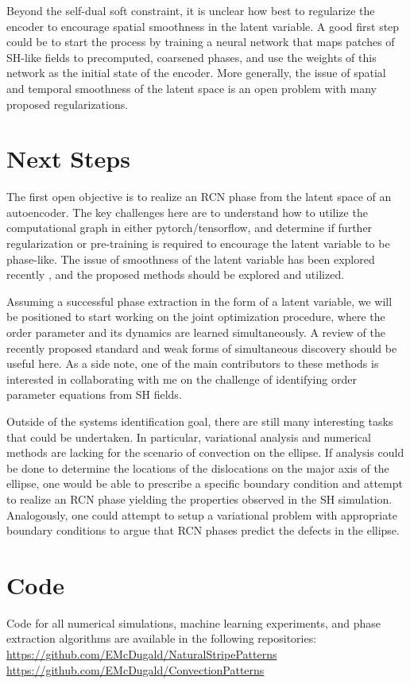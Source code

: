 \documentclass[12pt]{article}
\numberwithin{equation}{section}
\begin{document}
\par Beyond the self-dual soft constraint, it is unclear how best to regularize the encoder to encourage spatial smoothness in the latent variable. A good first step could be to start the process by training a neural network that maps patches of SH-like fields to precomputed, coarsened phases, and use the weights of this network as the initial state of the encoder. More generally, the issue of spatial and temporal smoothness of the latent space is an open problem with many proposed regularizations.


\section{Next Steps}

\par The first open objective is to realize an RCN phase from the latent space of an autoencoder. The key challenges here are to understand how to utilize the computational graph in either pytorch/tensorflow, and determine if further regularization or pre-training is required to encourage the latent variable to be phase-like. The issue of smoothness of the latent variable has been explored recently \cite{XIE2024}, and the proposed methods should be explored and utilized.
\par Assuming a successful phase extraction in the form of a latent variable, we will be positioned to start working on the joint optimization procedure, where the order parameter and its dynamics are learned simultaneously. A review of the recently proposed standard \cite{FRIES2022} and weak \cite{TRAN2023} forms of simultaneous discovery should be useful here. As a side note, one of the main contributors to these methods is interested in collaborating with me on the challenge of identifying order parameter equations from SH fields.
\par Outside of the systems identification goal, there are still many interesting tasks that could be undertaken. In particular, variational analysis and numerical methods are lacking for the scenario of convection on the ellipse. If analysis could be done to determine the locations of the dislocations on the major axis of the ellipse, one would be able to prescribe a specific boundary condition and attempt to realize an RCN phase yielding the properties observed in the SH simulation. Analogously, one could attempt to setup a variational problem with appropriate boundary conditions to argue that RCN phases predict the defects in the ellipse.

\section{Code}
Code for all numerical simulations, machine learning experiments, and phase extraction algorithms are available in the following repositories: \newline
\href{https://github.com/EMcDugald/NaturalStripePatterns}{https://github.com/EMcDugald/NaturalStripePatterns} \newline
\href{https://github.com/EMcDugald/ConvectionPatterns}{https://github.com/EMcDugald/ConvectionPatterns}




\end{document}
